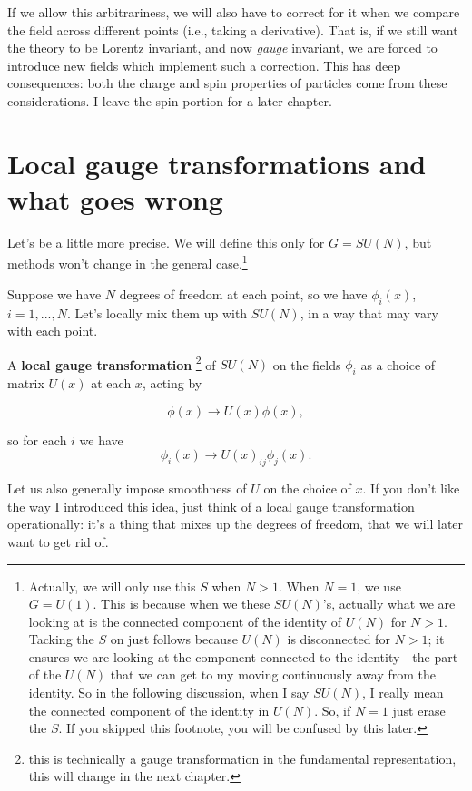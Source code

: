 \documentclass[main.tex]{subfiles}
\begin{document}
If we allow this arbitrariness, we will also have to correct for it when we compare the field across different points (i.e., taking a derivative). That is, if we still want the theory to be Lorentz invariant, and now \textit{gauge} invariant, we are forced to introduce new fields which implement such a correction. This has deep consequences: both the charge and spin properties of particles come from these considerations. I leave the spin portion for a later chapter.

\section{Local gauge transformations and what goes wrong}

Let's be a little more precise. We will define this only for $G = SU(N)$, but methods won't change in the general case.\footnote{Actually, we will only use this $S$ when $N > 1$. When $N = 1$, we use $G = U(1)$. This is because when we these $SU(N)$'s, actually what we are looking at is the connected component of the identity of $U(N)$ for $N > 1$. Tacking the $S$ on just follows because $U(N)$ is disconnected for $N > 1$; it ensures we are looking at the component connected to the identity - the part of the $U(N)$ that we can get to my moving continuously away from the identity. So in the following discussion, when I say $SU(N)$, I really mean the connected component of the identity in $U(N)$. So, if $N=1$ just erase the $S$. If you skipped this footnote, you will be confused by this later.}
 
Suppose we have $N$ degrees of freedom at each point, so we have $\phi_i (x)$, $i = 1,...,N$. Let's locally mix them up with $SU(N)$, in a way that may vary with each point.

\begin{defn}
A \textbf{local gauge transformation} \footnote{this is technically a gauge transformation in the fundamental representation, this will change in the next chapter.} of $SU(N)$ on the fields $\phi_i$ as a choice of matrix $U(x)$ at each $x$, acting by

\begin{equation} \label{localgaugetrans}
 \boxed{\phi (x) \to U(x) \phi(x),}
\end{equation}

so for each $i$ we have
\[
\phi_i(x) \to U(x)_{ij} \phi_j (x).
\]
\end{defn}
Let us also generally impose smoothness of $U$ on the choice of $x$. If you don't like the way I introduced this idea, just think of a local gauge transformation operationally: it's a thing that mixes up the degrees of freedom, that we will later want to get rid of.
\end{document}

